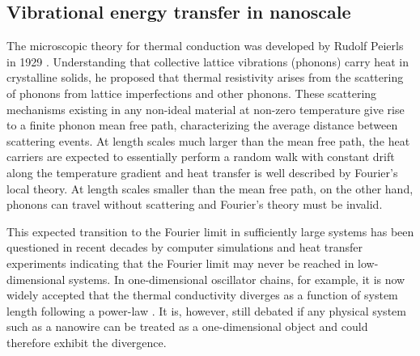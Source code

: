 

\subsection{Vibrational energy transfer in nanoscale}
\label{sec:intro_vib}
The microscopic theory for thermal conduction was developed by Rudolf Peierls in 1929 \cite{peierls29}. Understanding that collective lattice vibrations (phonons) carry heat in crystalline solids, he proposed that thermal resistivity arises from the scattering of phonons from lattice imperfections and other phonons. These scattering mechanisms existing in any non-ideal material at non-zero temperature give rise to a finite phonon mean free path, characterizing the average distance between scattering events. At length scales much larger than the mean free path, the heat carriers are expected to essentially perform a random walk with constant drift along the temperature gradient and heat transfer is well described by Fourier's local theory. At length scales smaller than the mean free path, on the other hand, phonons can travel without scattering and Fourier's theory must be invalid. 


This expected transition to the Fourier limit in sufficiently large systems has been questioned in recent decades by computer simulations \cite{lepri97,lepri03,mai07,dhar08} and heat transfer experiments \cite{yang10,xu14} indicating that the Fourier limit may never be reached in low-dimensional systems. In one-dimensional oscillator chains, for example, it is now widely accepted \cite{dhar08} that the thermal conductivity diverges as a function of system length following a power-law \cite{mai07}. It is, however, still debated \cite{marconnet13} if any physical system such as a nanowire can be treated as a one-dimensional object and could therefore exhibit the divergence. %

